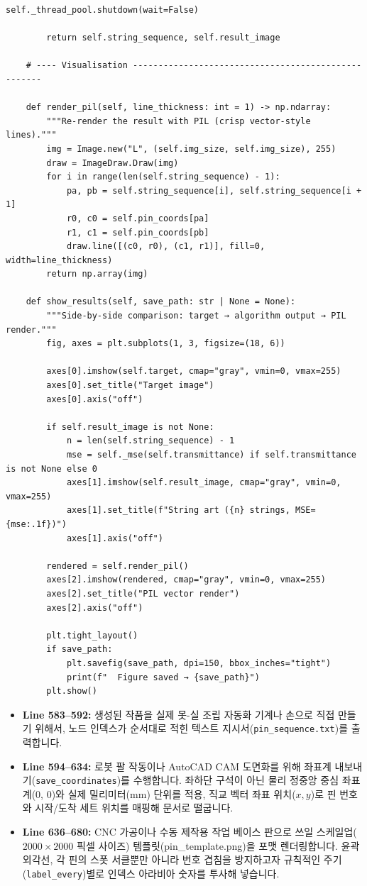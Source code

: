 \begin{lstlisting}[firstnumber=581]
        self._thread_pool.shutdown(wait=False)

        return self.string_sequence, self.result_image

    # ---- Visualisation ----------------------------------------------------

    def render_pil(self, line_thickness: int = 1) -> np.ndarray:
        """Re-render the result with PIL (crisp vector-style lines)."""
        img = Image.new("L", (self.img_size, self.img_size), 255)
        draw = ImageDraw.Draw(img)
        for i in range(len(self.string_sequence) - 1):
            pa, pb = self.string_sequence[i], self.string_sequence[i + 1]
            r0, c0 = self.pin_coords[pa]
            r1, c1 = self.pin_coords[pb]
            draw.line([(c0, r0), (c1, r1)], fill=0, width=line_thickness)
        return np.array(img)

    def show_results(self, save_path: str | None = None):
        """Side-by-side comparison: target → algorithm output → PIL render."""
        fig, axes = plt.subplots(1, 3, figsize=(18, 6))

        axes[0].imshow(self.target, cmap="gray", vmin=0, vmax=255)
        axes[0].set_title("Target image")
        axes[0].axis("off")

        if self.result_image is not None:
            n = len(self.string_sequence) - 1
            mse = self._mse(self.transmittance) if self.transmittance is not None else 0
            axes[1].imshow(self.result_image, cmap="gray", vmin=0, vmax=255)
            axes[1].set_title(f"String art ({n} strings, MSE={mse:.1f})")
            axes[1].axis("off")

        rendered = self.render_pil()
        axes[2].imshow(rendered, cmap="gray", vmin=0, vmax=255)
        axes[2].set_title("PIL vector render")
        axes[2].axis("off")

        plt.tight_layout()
        if save_path:
            plt.savefig(save_path, dpi=150, bbox_inches="tight")
            print(f"  Figure saved → {save_path}")
        plt.show()

\end{lstlisting}
\begin{itemize}
\item \textbf{Line 583--592:} 생성된 작품을 실제 못-실 조립 자동화 기계나 손으로 직접 만들기 위해서, 노드 인덱스가 순서대로 적힌 텍스트 지시서(\texttt{pin\_sequence.txt})를 출력합니다.
\item \textbf{Line 594--634:} 로봇 팔 작동이나 AutoCAD CAM 도면화를 위해 좌표계 내보내기(\texttt{save\_coordinates})를 수행합니다. 좌하단 구석이 아닌 물리 정중앙 중심 좌표계(0, 0)와 실제 밀리미터(mm) 단위를 적용, 직교 벡터 좌표 위치(\(x, y\))로 핀 번호와 시작/도착 세트 위치를 매핑해 문서로 떨굽니다.
\item \textbf{Line 636--680:} CNC 가공이나 수동 제작용 작업 베이스 판으로 쓰일 스케일업(\(2000\times2000\) 픽셀 사이즈) 템플릿(pin\_template.png)을 포맷 렌더링합니다. 윤곽 외각선, 각 핀의 스폿 서클뿐만 아니라 번호 겹침을 방지하고자 규칙적인 주기(\texttt{label\_every})별로 인덱스 아라비아 숫자를 투사해 넣습니다.
\end{itemize}

